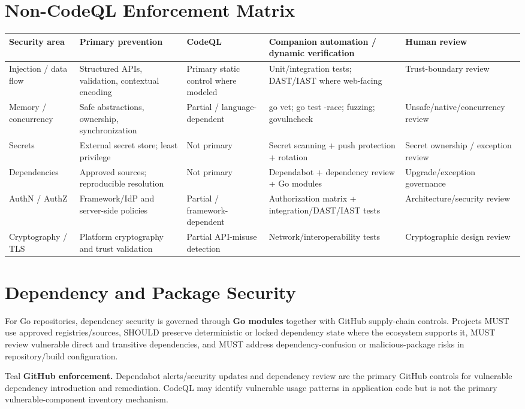 \documentclass[10pt,letterpaper]{article}
\begin{document}
\section{Non-CodeQL Enforcement Matrix}
\begin{tabularx}{\textwidth}{@{}P{1.22in}Y P{1.55in} P{1.55in} P{1.5in}@{}}
\toprule
\textbf{Security area} & \textbf{Primary prevention} & \textbf{CodeQL} & \textbf{Companion automation / dynamic verification} & \textbf{Human review}\\
\midrule
Injection / data flow & Structured APIs, validation, contextual encoding & Primary static control where modeled & Unit/integration tests; DAST/IAST where web-facing & Trust-boundary review\\
Memory / concurrency & Safe abstractions, ownership, synchronization & Partial / language-dependent & go vet; go test -race; fuzzing; govulncheck & Unsafe/native/concurrency review\\
Secrets & External secret store; least privilege & Not primary & Secret scanning + push protection + rotation & Secret ownership / exception review\\
Dependencies & Approved sources; reproducible resolution & Not primary & Dependabot + dependency review + Go modules & Upgrade/exception governance\\
AuthN / AuthZ & Framework/IdP and server-side policies & Partial / framework-dependent & Authorization matrix + integration/DAST/IAST tests & Architecture/security review\\
Cryptography / TLS & Platform cryptography and trust validation & Partial API-misuse detection & Network/interoperability tests & Cryptographic design review\\
\bottomrule
\end{tabularx}

\section{Dependency and Package Security}
For Go repositories, dependency security is governed through \textbf{Go modules} together with GitHub supply-chain controls. Projects MUST use approved registries/sources, SHOULD preserve deterministic or locked dependency state where the ecosystem supports it, MUST review vulnerable direct and transitive dependencies, and MUST address dependency-confusion or malicious-package risks in repository/build configuration.

\begin{callout}{Teal}
\textbf{GitHub enforcement.} Dependabot alerts/security updates and dependency review are the primary GitHub controls for vulnerable dependency introduction and remediation. CodeQL may identify vulnerable usage patterns in application code but is not the primary vulnerable-component inventory mechanism.
\end{callout}
\end{document}
